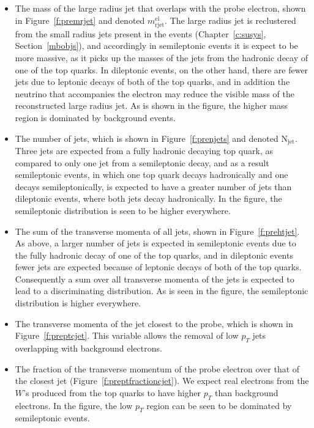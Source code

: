 \begin{itemize}

	\item The mass of the large radius jet that overlaps with the probe electron,
				shown in Figure~\ref{f:premrjet} and denoted $m_{\text{rjet}}^{\text{el}}$. 
				The large radius jet is reclustered from the
	      small radius jets present in the events (Chapter~\ref{c:susys},
	      Section~\ref{mbobjs}), and accordingly in semileptonic events it is expect to be
	      more massive, as it picks up the masses of the jets from the hadronic decay of
	      one of the top quarks. In dileptonic events, on the other hand, there are fewer jets
	      due to leptonic decays of both of the top quarks, and in addition the
	      neutrino that accompanies the electron may reduce the visible mass of the
	      reconstructed large radius jet. As is shown in the figure, the higher mass
	      region is dominated by background events.


	\item The number of jets, which is shown in Figure~\ref{f:prenjets} and denoted 
	      $\text{N}_{\text{jet}}$. Three jets
	      are expected from a fully hadronic decaying top quark, as compared to only one
	      jet from a semileptonic decay, and as a result semileptonic events, in which
	      one top quark decays hadronically and one decays semileptonically, is expected
	      to have a greater number of jets than dileptonic events, where both jets decay
	      hadronically. In the figure, the semileptonic distribution is seen to be higher
	      everywhere.


	\item The sum of the transverse momenta of all jets, shown in
	      Figure~\ref{f:prehtjet}. As above, a larger number of jets is expected in
	      semileptonic events due to the fully hadronic decay of one of the top quarks,
	      and in dileptonic events fewer jets are expected because of leptonic decays of
	      both of the top quarks. Consequently a sum over all transverse momenta of the
	      jets is expected to lead to a discriminating distribution. As is seen in the
	      figure, the semileptonic distribution is higher everywhere.


	\item The transverse momenta of the jet closest to the probe, which is shown in
	      Figure~\ref{f:preptcjet}. This variable allows the removal of low $p_T$ jets
	      overlapping with background electrons.


	\item The fraction of the transverse momentum of the probe electron over that
	      of the closest jet (Figure~\ref{f:preptfractioncjet}). We expect real electrons
	      from the $W$'s produced from the top quarks to have higher $p_T$ than
	      background electrons. In the figure, the low $p_T$ region can be seen to be
	      dominated by semileptonic events.

\end{itemize}

